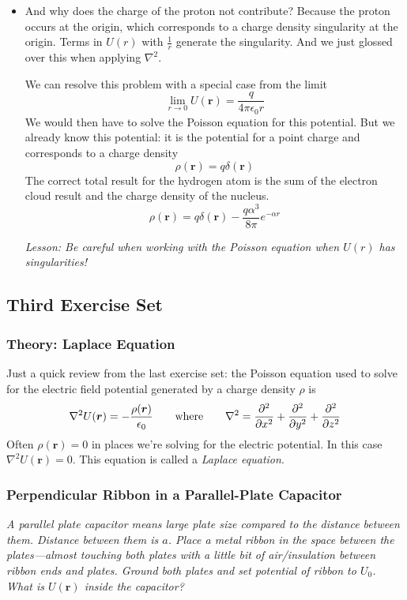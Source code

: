 \documentclass[11pt, a4paper]{article}
\newcommand{\eqtext}[1]{\qquad \text{#1} \qquad}
\renewcommand{\vec}[1]{\bm{#1}} %
\renewcommand{\r}{\vec{r}}
\newcommand{\e}{\epsilon_{0}} %
\renewcommand{\laplacian}{\nabla^{2}}
\begin{document}
\begin{itemize}
	\item And why does the charge of the proton not contribute? Because the proton occurs at the origin, which corresponds to a charge density singularity at the origin. Terms in $ U(r) $ with $ \frac{1}{r} $ generate the singularity. And we just glossed over this when applying $ \nabla^{2} $. 
	
	We can resolve this problem with a special case from the limit
	\begin{equation*}
		\lim_{r\to 0}U(\r) = \frac{q}{4\pi \epsilon_{0} r}
	\end{equation*}
	We would then have to solve the Poisson equation for this potential. But we already know this potential: it is the potential for a point charge and corresponds to a charge density
	\begin{equation*}
		\rho(\r) = q \delta(\r)
	\end{equation*}
	The correct total result for the hydrogen atom is the sum of the electron cloud result and the charge density of the nucleus.
	\begin{equation*}
		\rho(\r) = q \delta(\r) - \frac{q\alpha^{3}}{8 \pi}e^{-\alpha r}
	\end{equation*}
	
	\textit{Lesson: Be careful when working with the Poisson equation when $ U(r) $ has singularities!}
	
\end{itemize}

\subsection{Third Exercise Set}

\subsubsection{Theory: Laplace Equation}
Just a quick review from the last exercise set: the Poisson equation used to solve for the electric field potential generated by a charge density $ \rho $ is
\begin{equation*}
	\nabla^{2}U(\r) = - \frac{\rho(\r)}{\e} \eqtext{where} \laplacian = \pdv[2]{}{x} + \pdv[2]{}{y} + \pdv[2]{}{z}
\end{equation*}
Often $ \rho(\r) = 0 $ in places we're solving for the electric potential. In this case $ \laplacian U(\r) = 0 $. This equation is called a \textit{Laplace equation}.

\subsubsection{Perpendicular Ribbon in a Parallel-Plate Capacitor}
\textit{A parallel plate capacitor means large plate size compared to the distance between them. Distance between them is $ a $. Place a metal ribbon in the space between the plates---almost touching both plates with a little bit of air/insulation between ribbon ends and plates. Ground both plates and set potential of ribbon to $ U_{0} $. What is $ U(\r) $ inside the capacitor?}
\end{document}
